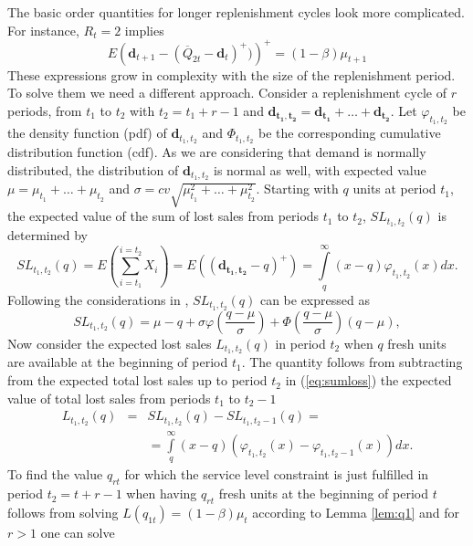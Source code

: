 The basic order quantities for longer replenishment cycles look more complicated. For instance, $R_t=2$ implies
$$E\left(\boldsymbol{d}_{t+1}-(\overline Q_{2t}-\boldsymbol{d}_{t})^+)\right)^+=(1-\beta)\mu_{t+1}$$
%
These expressions grow in complexity with the size of the replenishment period. To solve them we need a different approach.
%
Consider a replenishment cycle of $r$ periods, from $t_1$ to $t_2$ with $t_2=t_1+r-1$ and $\boldsymbol{d_{t_1,t_2}} = \boldsymbol {d_{t_1}} + \ldots + \boldsymbol {d_{t_2}}$.  Let $\varphi_{t_1,t_2}$ be the density function (pdf) of $\boldsymbol d_{t_1,t_2}$ and $\Phi_{t_1,t_2}$ be the corresponding cumulative distribution function (cdf). As we are considering that demand is normally distributed, the distribution of $\boldsymbol d_{t_1,t_2}$ is normal as well, with expected value $\mu=\mu_{t_1} + \ldots + \mu_{t_2}$ and $\sigma=cv \sqrt{\mu^2_{t_1} + \ldots+\mu^2_{t_2}}$. Starting with $q$ units at period $t_1$, the expected value of the sum of lost sales from periods $t_1$ to $t_2$, $SL_{t_1,t_2}(q)$ is determined by
\begin{equation}
\label{eq:sumloss}
SL_{t_1,t_2}(q)=E\left(\sum\limits_{i=t_1}^{i=t_2}X_i\right) =E\left((\boldsymbol{d_{t_1,t_2}}-q)^+\right)= \int\limits_{q}^{\infty} (x-q)\varphi_{t_1,t_2}(x)dx.
\end{equation}
Following the considerations in \cite{Rossi14}, $SL_{t_1,t_2}(q)$ can be expressed as
%
\begin{equation}
\label{eq:rossitotloss}
SL_{t_1,t_2}(q)=\mu-q+\sigma\varphi\left(\frac{q-\mu}{\sigma}\right)+\Phi\left(\frac{q-\mu}{\sigma}\right)(q-\mu),
 \end{equation}
Now consider the expected lost sales $L_{t_1,t_2}(q)$ in period $t_2$ when $q$ fresh units are available at the beginning of period $t_1$. The quantity follows from subtracting from the expected total lost sales up to period $t_2$ in (\ref{eq:sumloss}) the expected value of total lost sales from periods $t_1$ to $t_2 -1$
\begin{eqnarray}
\label{eq:lostsalesgeneral}
L_{t_1,t_2}(q)&=& SL_{t_1,t_2}(q)- SL_{t_1,t_2-1}(q) = \\ \nonumber
&&=\int\limits_{q}^{\infty} (x-q)\left(\varphi_{t_1,t_2}(x)-\varphi_{t_1,t_2-1}(x)\right)dx.
\end{eqnarray}
To find the value $q_{rt}$ for which the service level constraint is just fulfilled in period $t_2=t+r-1$ when having $q_{rt}$ fresh units at the beginning of period $t$ follows from solving $L(q_{1t})=(1-\beta)\mu_t$ according to Lemma \ref{lem:q1} and for $r>1$ one can solve

